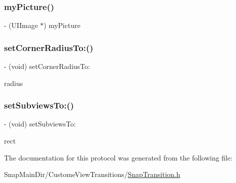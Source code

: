 \hypertarget{protocol_snap_transition-p_aa6a9d9097c189c68f38c66c5a12fabf0}{}\label{protocol_snap_transition-p_aa6a9d9097c189c68f38c66c5a12fabf0} 
\subsubsection{\texorpdfstring{my\+Picture()}{myPicture()}}
{\footnotesize\ttfamily -\/ (U\+I\+Image $\ast$) my\+Picture \begin{DoxyParamCaption}{ }\end{DoxyParamCaption}}

\hypertarget{protocol_snap_transition-p_a24446e2ac371f496795947bb6ba6df1b}{}\label{protocol_snap_transition-p_a24446e2ac371f496795947bb6ba6df1b} 
\subsubsection{\texorpdfstring{set\+Corner\+Radius\+To\+:()}{setCornerRadiusTo:()}}
{\footnotesize\ttfamily -\/ (void) set\+Corner\+Radius\+To\+: \begin{DoxyParamCaption}\item[{(C\+G\+Float)}]{radius }\end{DoxyParamCaption}}

\hypertarget{protocol_snap_transition-p_aeedd9e588819333a4d22199deb0db01d}{}\label{protocol_snap_transition-p_aeedd9e588819333a4d22199deb0db01d} 
\subsubsection{\texorpdfstring{set\+Subviews\+To\+:()}{setSubviewsTo:()}}
{\footnotesize\ttfamily -\/ (void) set\+Subviews\+To\+: \begin{DoxyParamCaption}\item[{(C\+G\+Rect)}]{rect }\end{DoxyParamCaption}}



The documentation for this protocol was generated from the following file\+:\begin{DoxyCompactItemize}
\item 
Snap\+Main\+Dir/\+Custome\+View\+Transitions/\hyperlink{_snap_transition_8h}{Snap\+Transition.\+h}\end{DoxyCompactItemize}
